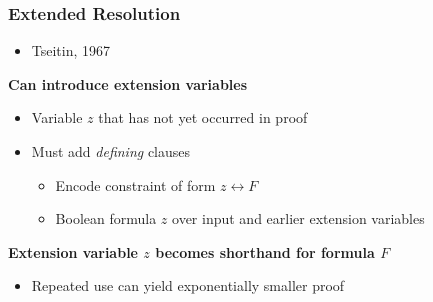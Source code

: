 \documentclass[t,pdf]{beamer}
\begin{document}
\begin{frame}
  \frametitle{Extended Resolution}
  
\begin{itemize}
\item Tseitin, 1967
\end{itemize}

{\bf Can introduce extension variables}
\begin{itemize}
\item Variable $z$ that has not yet occurred in proof
\item Must add {\em defining} clauses
\begin{itemize}
\item Encode constraint of form $z \leftrightarrow F$
\item Boolean formula $z$ over input and earlier extension variables
\end{itemize}
\end{itemize}

\vspace{20pt}

{\bf Extension variable $z$ becomes shorthand for formula $F$}
  \begin{itemize}
  \item Repeated use can yield exponentially smaller proof
  \end{itemize}


\end{frame}
\end{document}
